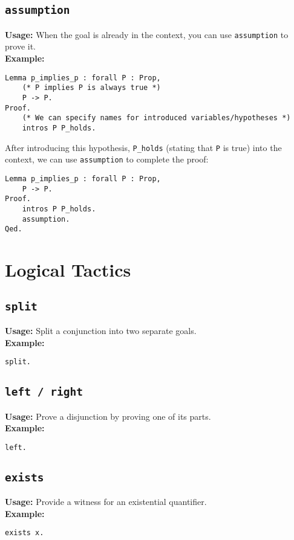 \documentclass{article}
\begin{document}
\subsection{\texttt{assumption}}
\textbf{Usage:} When the goal is already in the context, you can use \texttt{assumption} to prove it.\\
\textbf{Example:}
\begin{lstlisting}[language=Coq]
    Lemma p_implies_p : forall P : Prop,
    (* P implies P is always true *)
    P -> P.
Proof.
    (* We can specify names for introduced variables/hypotheses *)
    intros P P_holds.
\end{lstlisting}
After introducing this hypothesis, \texttt{P_holds} (stating that \texttt{P} is true) into the context, we can use \texttt{assumption} to complete the proof:
\begin{lstlisting}[language=Coq]
    Lemma p_implies_p : forall P : Prop,
    P -> P.
Proof.
    intros P P_holds.
    assumption.
Qed.
\end{lstlisting}

\section{Logical Tactics}
\subsection{\texttt{split}}
\textbf{Usage:} Split a conjunction into two separate goals. \\
\textbf{Example:}
\begin{lstlisting}[language=Coq]
split.
\end{lstlisting}

\subsection{\texttt{left / right}}
\textbf{Usage:} Prove a disjunction by proving one of its parts. \\
\textbf{Example:}
\begin{lstlisting}[language=Coq]
left.
\end{lstlisting}

\subsection{\texttt{exists}}
\textbf{Usage:} Provide a witness for an existential quantifier. \\
\textbf{Example:}
\begin{lstlisting}[language=Coq]
exists x.
\end{lstlisting}
\end{document}
